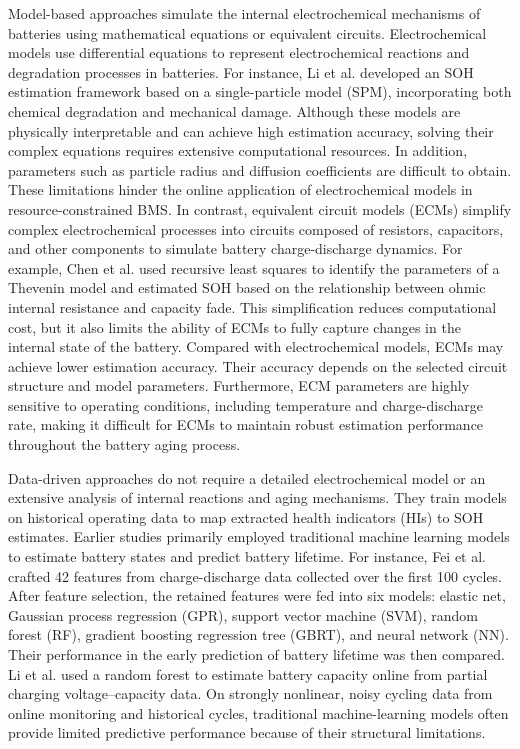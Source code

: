 Model-based approaches simulate the internal electrochemical mechanisms of batteries using mathematical equations or equivalent circuits\cite{ref19}. Electrochemical models use differential equations to represent electrochemical reactions and degradation processes in batteries. For instance, Li et al.\cite{ref21} developed an SOH estimation framework based on a single-particle model (SPM), incorporating both chemical degradation and mechanical damage. Although these models are physically interpretable and can achieve high estimation accuracy, solving their complex equations requires extensive computational resources. In addition, parameters such as particle radius and diffusion coefficients are difficult to obtain. These limitations hinder the online application of electrochemical models in resource-constrained BMS\cite{ref20,ref22,ref23}. In contrast, equivalent circuit models (ECMs) simplify complex electrochemical processes into circuits composed of resistors, capacitors, and other components to simulate battery charge-discharge dynamics. For example, Chen et al.\cite{ref24} used recursive least squares to identify the parameters of a Thevenin model and estimated SOH based on the relationship between ohmic internal resistance and capacity fade. This simplification reduces computational cost, but it also limits the ability of ECMs to fully capture changes in the internal state of the battery. Compared with electrochemical models, ECMs may achieve lower estimation accuracy. Their accuracy depends on the selected circuit structure and model parameters. Furthermore, ECM parameters are highly sensitive to operating conditions, including temperature and charge-discharge rate, making it difficult for ECMs to maintain robust estimation performance throughout the battery aging process.

Data-driven approaches do not require a detailed electrochemical model or an extensive analysis of internal reactions and aging mechanisms\cite{ref11}. They train models on historical operating data to map extracted health indicators (HIs) to SOH estimates. Earlier studies primarily employed traditional machine learning models to estimate battery states and predict battery lifetime\cite{ref25}. For instance, Fei et al.\cite{ref26} crafted 42 features from charge-discharge data collected over the first 100 cycles. After feature selection, the retained features were fed into six models: elastic net, Gaussian process regression (GPR), support vector machine (SVM), random forest (RF), gradient boosting regression tree (GBRT), and neural network (NN). Their performance in the early prediction of battery lifetime was then compared. Li et al.\cite{ref27} used a random forest to estimate battery capacity online from partial charging voltage--capacity data. On strongly nonlinear, noisy cycling data from online monitoring and historical cycles, traditional machine-learning models often provide limited predictive performance because of their structural limitations.

